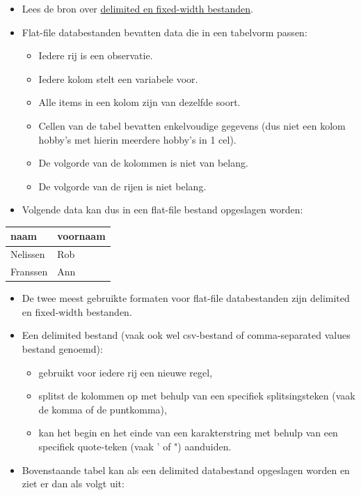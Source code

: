 \documentclass[]{tufte-book}
\providecommand{\tightlist}{%
  \setlength{\itemsep}{0pt}\setlength{\parskip}{0pt}}
\begin{document}
\begin{itemize}
\tightlist
\item
  Lees de bron over \href{https://www.techwalla.com/articles/what-is-a-delimited-a-fixed-width-file}{delimited en fixed-width bestanden}.
\item
  Flat-file databestanden bevatten data die in een tabelvorm passen:

  \begin{itemize}
  \tightlist
  \item
    Iedere rij is een observatie.
  \item
    Iedere kolom stelt een variabele voor.
  \item
    Alle items in een kolom zijn van dezelfde soort.
  \item
    Cellen van de tabel bevatten enkelvoudige gegevens (dus niet een kolom hobby's met hierin meerdere hobby's in 1 cel).
  \item
    De volgorde van de kolommen is niet van belang.
  \item
    De volgorde van de rijen is niet belang.
  \end{itemize}
\item
  Volgende data kan dus in een flat-file bestand opgeslagen worden:
\end{itemize}

\begin{longtable}[]{@{}ll@{}}
\toprule
naam & voornaam\tabularnewline
\midrule
\endhead
Nelissen & Rob\tabularnewline
Franssen & Ann\tabularnewline
\bottomrule
\end{longtable}

\begin{itemize}
\tightlist
\item
  De twee meest gebruikte formaten voor flat-file databestanden zijn delimited en fixed-width bestanden.
\item
  Een delimited bestand (vaak ook wel csv-bestand of comma-separated values bestand genoemd):

  \begin{itemize}
  \tightlist
  \item
    gebruikt voor iedere rij een nieuwe regel,
  \item
    splitst de kolommen op met behulp van een specifiek splitsingsteken (vaak de komma of de puntkomma),
  \item
    kan het begin en het einde van een karakterstring met behulp van een specifiek quote-teken (vaak ' of ") aanduiden.
  \end{itemize}
\item
  Bovenstaande tabel kan als een delimited databestand opgeslagen worden en ziet er dan als volgt uit:
\end{itemize}
\end{document}
